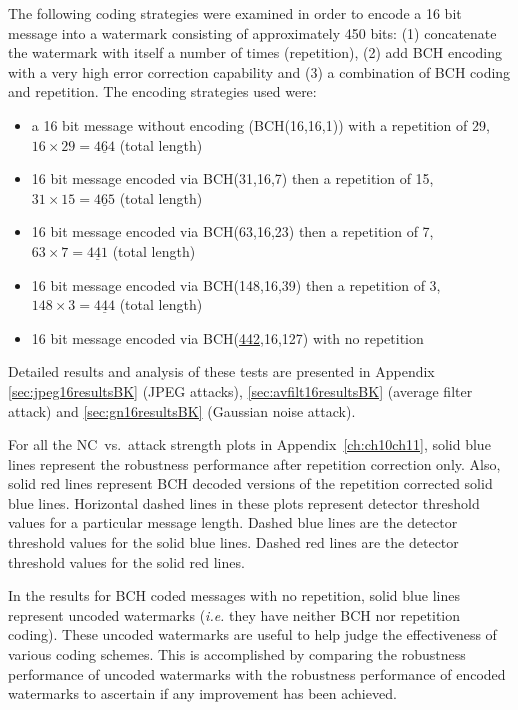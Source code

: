 \documentclass[12pt]{report}
\begin{document}
The following coding strategies were examined in order to encode a 16 bit message into a watermark consisting of
approximately 450 bits: (1) concatenate the watermark with itself a number of times (repetition),
(2) add BCH encoding with a very high error correction capability and (3) a combination of BCH coding and repetition.
The encoding strategies used were:
\begin{itemize}
	\item a 16 bit message without encoding (BCH(16,16,1)) with a repetition of 29, $16 \times 29 = \underline{464}$ (total length)
	\item 16 bit message encoded via BCH(31,16,7) then a repetition of 15, $31 \times 15 = \underline{465}$ (total length)
	\item 16 bit message encoded via BCH(63,16,23) then a repetition of 7, $63 \times 7 = \underline{441}$ (total length)
	\item 16 bit message encoded via BCH(148,16,39) then a repetition of 3, $148 \times 3 = \underline{444}$ (total length)
	\item 16 bit message encoded via BCH(\underline{442},16,127) with no repetition
\end{itemize} 

Detailed results and analysis of these tests are presented in Appendix \ref{sec:jpeg16resultsBK} (JPEG attacks),
\ref{sec:avfilt16resultsBK} (average filter attack) and \ref{sec:gn16resultsBK} (Gaussian noise attack).

For all the NC~vs.~attack strength plots in Appendix~\ref{ch:ch10ch11},
solid blue lines represent the robustness performance after repetition correction only. Also,
solid red lines represent BCH decoded versions of the repetition corrected solid blue lines. 
Horizontal dashed lines in these plots represent detector threshold values for a particular message length.
Dashed blue lines are the detector threshold values for the solid blue lines.
Dashed red lines are the detector threshold values for the solid red lines.

In the results for BCH coded messages with no repetition, solid blue lines represent uncoded watermarks
(\emph{i.e.} they have neither BCH nor repetition coding). 
These uncoded watermarks are useful to help judge the effectiveness of various coding schemes.
This is accomplished by comparing the robustness performance of uncoded watermarks with the 
robustness performance of encoded watermarks to ascertain if any improvement has been achieved.
\end{document}
